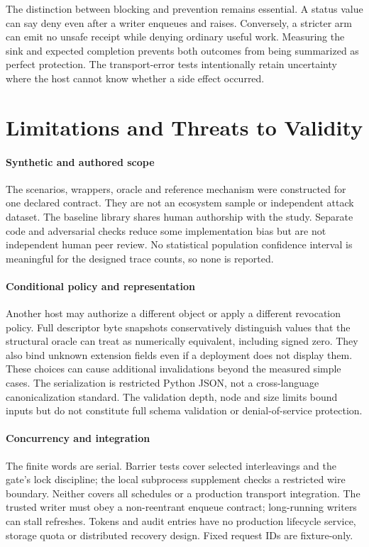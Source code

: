 The distinction between blocking and prevention remains essential. A status value
can say deny even after a writer enqueues and raises. Conversely, a stricter arm
can emit no unsafe receipt while denying ordinary useful work. Measuring the sink
and expected completion prevents both outcomes from being summarized as perfect
protection. The transport-error tests intentionally retain uncertainty where the
host cannot know whether a side effect occurred.

\section{Limitations and Threats to Validity}
\paragraph{Synthetic and authored scope}
The scenarios, wrappers, oracle and reference mechanism were constructed for one
declared contract. They are not an ecosystem sample or independent attack dataset.
The baseline library shares human authorship with the study. Separate code and
adversarial checks reduce some implementation bias but are not independent human
peer review. No statistical population confidence interval is meaningful for the
designed trace counts, so none is reported.

\paragraph{Conditional policy and representation}
Another host may authorize a different object or apply a different revocation
policy. Full descriptor byte snapshots conservatively distinguish values that the
structural oracle can treat as numerically equivalent, including signed zero.
They also bind unknown extension fields even if a deployment does not display them.
These choices can cause additional invalidations beyond the measured simple cases.
The serialization is restricted Python JSON, not a cross-language canonicalization
standard. The validation depth, node and size limits bound inputs but do not
constitute full schema validation or denial-of-service protection.

\paragraph{Concurrency and integration}
The finite words are serial. Barrier tests cover selected interleavings and the
gate's lock discipline; the local subprocess supplement checks a restricted wire
boundary. Neither covers all schedules or a production transport integration.
The trusted writer must obey a non-reentrant enqueue contract; long-running writers
can stall refreshes. Tokens and audit entries have no production lifecycle service,
storage quota or distributed recovery design. Fixed request IDs are fixture-only.

